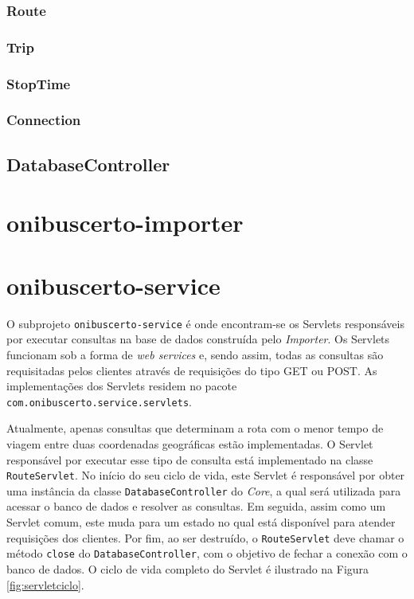 \subsubsection{Route}

\subsubsection{Trip}

\subsubsection{StopTime}

\subsubsection{Connection}


\subsection{DatabaseController}


\section{onibuscerto-importer}

\section{onibuscerto-service}

O subprojeto \texttt{onibuscerto-service} é onde encontram-se os Servlets responsáveis por executar consultas na base de dados construída pelo \emph{Importer}.
Os Servlets funcionam sob a forma de \emph{web services} e, sendo assim, todas as consultas são requisitadas pelos clientes através de requisições  do tipo GET ou POST.
As implementações dos Servlets residem no pacote \texttt{com.onibuscerto.service.servlets}.

Atualmente, apenas consultas que determinam a rota com o menor tempo de viagem entre duas coordenadas geográficas estão implementadas.
O Servlet responsável por executar esse tipo de consulta está implementado na classe \texttt{RouteServlet}.
No início do seu ciclo de vida, este Servlet é responsável por obter uma instância da classe \texttt{DatabaseController} do \emph{Core}, a qual será utilizada para acessar o banco de dados e resolver as consultas.
Em seguida, assim como um Servlet comum, este muda para um estado no qual está disponível para atender requisições dos clientes.
Por fim, ao ser destruído, o \texttt{RouteServlet} deve chamar o método \texttt{close} do \texttt{DatabaseController}, com o objetivo de fechar a conexão com o banco de dados.
O ciclo de vida completo do Servlet é ilustrado na Figura \ref{fig:servletciclo}.

